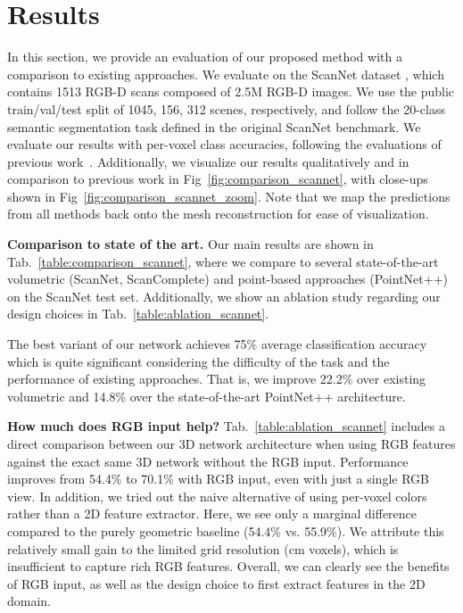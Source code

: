 

\section{Results}
\label{sec:results}

In this section, we provide an evaluation of our proposed method with a comparison to existing approaches.
We evaluate on the ScanNet dataset \cite{dai2017scannet}, which contains 1513 RGB-D scans composed of 2.5M RGB-D images.
We use the public train/val/test split of 1045, 156, 312 scenes, respectively, and follow the 20-class semantic segmentation task defined in the original ScanNet benchmark.
We evaluate our results with per-voxel class accuracies, following the evaluations of previous work~\cite{dai2017scannet,qi2017pointnet++,dai2018scancomplete}.
Additionally, we visualize our results qualitatively and in comparison to previous work in Fig~\ref{fig:comparison_scannet}, with close-ups shown in Fig~\ref{fig:comparison_scannet_zoom}. Note that we map the predictions from all methods back onto the mesh reconstruction for ease of visualization.

\vspace{0.2cm}\noindent
\textbf{Comparison to state of the art.}
Our main results are shown in Tab.~\ref{table:comparison_scannet}, where we compare to several state-of-the-art volumetric (ScanNet\cite{dai2017scannet}, ScanComplete\cite{dai2018scancomplete}) and point-based approaches (PointNet++\cite{qi2017pointnet++}) on the ScanNet test set.
Additionally, we show an ablation study regarding our design choices in Tab.~\ref{table:ablation_scannet}.

The best variant of our \OURS{} network achieves 75\% average classification accuracy which is quite significant considering the difficulty of the task and the performance of existing approaches.
That is, we improve 22.2\% over existing volumetric and 14.8\% over the state-of-the-art PointNet++ architecture. 


\vspace{0.2cm}\noindent
\textbf{How much does RGB input help?}
Tab.~\ref{table:ablation_scannet} includes a direct comparison between our 3D network architecture when using RGB features against the exact same 3D network without the RGB input.
Performance improves from 54.4\% to 70.1\% with RGB input, even with just a single RGB view.
In addition, we tried out the naive alternative of using per-voxel colors rather than a 2D feature extractor.
Here, we see only a marginal difference compared to the purely geometric baseline (54.4\% vs. 55.9\%).
We attribute this relatively small gain to the limited grid resolution (cm voxels), which is insufficient to capture rich RGB features.
Overall, we can clearly see the benefits of RGB input, as well as the design choice to first extract features in the 2D domain.

